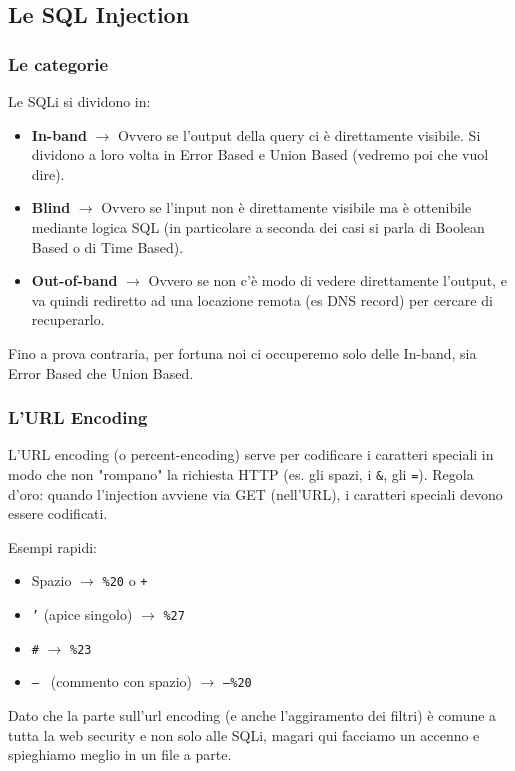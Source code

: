 \documentclass[12pt,a4paper]{report}
\begin{document}
	\subsection{Le SQL Injection}
	
	\subsubsection{Le categorie}
	Le SQLi si dividono in:
	\begin{itemize}
		\item \textbf{In-band} $\rightarrow$ Ovvero se l'output della query ci è direttamente visibile. Si dividono a loro volta in Error Based e Union Based (vedremo poi che vuol dire).
		\item \textbf{Blind} $\rightarrow$ Ovvero se l'input non è direttamente visibile ma è ottenibile mediante logica SQL (in particolare a seconda dei casi si parla di Boolean Based o di Time Based).
		\item \textbf{Out-of-band} $\rightarrow$ Ovvero se non c'è modo di vedere direttamente l'output, e va quindi rediretto ad una locazione remota (es DNS record) per cercare di recuperarlo. 
	\end{itemize}
	Fino a prova contraria, per fortuna noi ci occuperemo solo delle In-band, sia Error Based che Union Based.
	
	\subsubsection{L'URL Encoding}
	L'URL encoding (o percent-encoding) serve per codificare i caratteri speciali in modo che non "rompano" la richiesta HTTP (es. gli spazi, i \texttt{\&}, gli \texttt{=}). Regola d'oro: quando l'injection avviene via GET (nell'URL), i caratteri speciali devono essere codificati.
	
	Esempi rapidi:
	\begin{itemize}
		\item Spazio $\rightarrow$ \texttt{\%20} o \texttt{+}
		\item \texttt{'} (apice singolo) $\rightarrow$ \texttt{\%27}
		\item \texttt{\#} $\rightarrow$ \texttt{\%23}
		\item \texttt{-- } (commento con spazio) $\rightarrow$ \texttt{--\%20}
	\end{itemize}
	Dato che la parte sull'url encoding (e anche l'aggiramento dei filtri) è comune a tutta la web security e non solo alle SQLi, magari qui facciamo un accenno e spieghiamo meglio in un file a parte.
	
\end{document}
